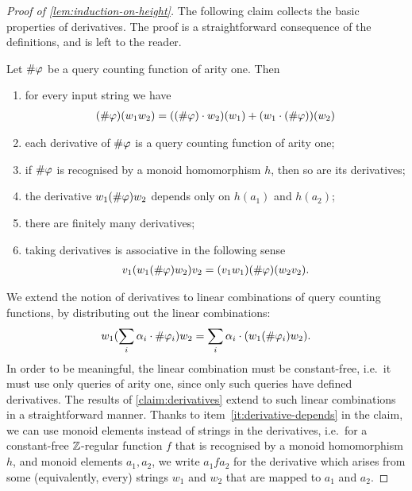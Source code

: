 \begin{proof}[Proof of \cref{lem:induction-on-height}]
The following claim collects the basic properties of derivatives. The proof is a straightforward consequence of the definitions, and is left to the reader.  
\begin{claim}\label{claim:derivatives}
    Let $\#{\varphi}$ be a query counting function of arity one. Then
    \begin{enumerate}
        \item \label{it:derivative-add} for every input string we have
         \begin{align*}
(\#{\varphi})(w_1 w_2) = ((\#{\varphi}) \cdot w_2)(w_1) + (w_1 \cdot (\#{\varphi}))(w_2)
\end{align*}
        \item \label{it:derivative-homo} each derivative of $\#{\varphi}$ is a query counting function of arity one;
        \item \label{it:derivative-homo2} if $\#{\varphi}$ is recognised by a monoid homomorphism $h$, then so are  its derivatives;
                \item \label{it:derivative-depends} the derivative $w_1(\#{\varphi}) w_2$ depends only on $h(a_1)$ and $h(a_2)$;
                \item \label{it:derivative-finite} there are finitely many derivatives;
        \item  \label{it:derivative-associative} taking derivatives is associative in the following sense
        \begin{align*}
        v_1 (w_1 (\#{\varphi}) w_2) v_2 = (v_1 w_1) (\#{\varphi}) (w_2 v_2).
        \end{align*}
    \end{enumerate}
\end{claim}


We extend the notion of derivatives to linear combinations of query counting functions,  by distributing out the linear combinations:
\begin{align*}
w_1(\sum_i \alpha_i \cdot  \#{\varphi_i}) w_2 = \sum_i \alpha_i \cdot (w_1(\#{\varphi_i}) w_2).
\end{align*} 
In order to be meaningful,  the linear combination must be constant-free, i.e.~it must use only queries of arity one, since only such queries have  defined derivatives. 
The results of \cref{claim:derivatives} extend to such  linear combinations in a straightforward manner. Thanks to item~\ref{it:derivative-depends} in the claim, we can use monoid elements instead of strings in the derivatives, i.e.~for a constant-free ${\mathbb Z}$-regular function $f$ that is recognised by a monoid homomorphism $h$, and monoid elements $a_1, a_2$, we write $a_1 f a_2$ for the derivative which arises from some (equivalently, every) strings $w_1$ and $w_2$ that are mapped to $a_1$ and $a_2$. 



\end{proof}
